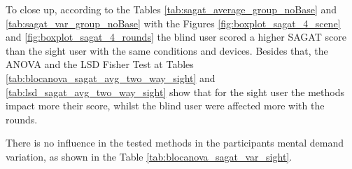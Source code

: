 
%

To close up, according to the Tables \ref{tab:sagat_average_group_noBase} and \ref{tab:sagat_var_group_noBase} with the Figures \ref{fig:boxplot_sagat_4_scene} and \ref{fig:boxplot_sagat_4_rounds} the blind user scored a higher SAGAT score than the sight user with the same conditions and devices. Besides that, the ANOVA and the LSD Fisher Test at Tables \ref{tab:blocanova_sagat_avg_two_way_sight} and \ref{tab:lsd_sagat_avg_two_way_sight} show that for the sight user the methods impact more their score, whilst the blind user were affected more with the rounds.

There is no influence in the tested methods in the participants mental demand variation, as shown in the Table \ref{tab:blocanova_sagat_var_sight}.

\FloatBarrier